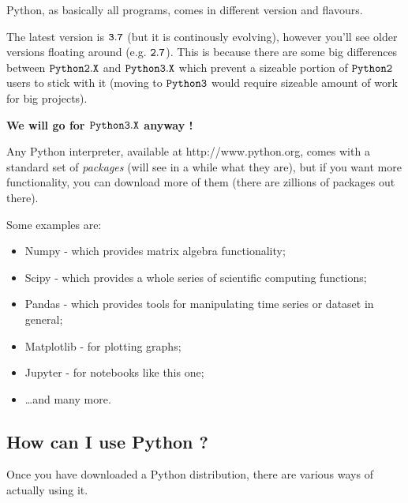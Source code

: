 \documentclass[11pt]{article}
\providecommand{\tightlist}{%
      \setlength{\itemsep}{0pt}\setlength{\parskip}{0pt}}
\begin{document}
Python, as basically all programs, comes in different version and
flavours.

The latest version is \(\tt{3.7}\) (but it is continously evolving),
however you'll see older versions floating around (e.g. \(\tt{2.7}\)).
This is because there are some big differences between
\(\tt{Python 2.X}\) and \(\tt{Python 3.X}\) which prevent a sizeable
portion of \(\tt{Python 2}\) users to stick with it (moving to
\(\tt{Python 3}\) would require sizeable amount of work for big
projects).

\textbf{We will go for \(\tt{Python 3.X}\) anyway !}

Any Python interpreter, available at http://www.python.org, comes with a
standard set of \emph{packages} (will see in a while what they are), but
if you want more functionality, you can download more of them (there are
zillions of packages out there).

Some examples are:

\begin{itemize}
\tightlist
\item
  Numpy - which provides matrix algebra functionality;
\item
  Scipy - which provides a whole series of scientific computing
  functions;
\item
  Pandas - which provides tools for manipulating time series or dataset
  in general;
\item
  Matplotlib - for plotting graphs;
\item
  Jupyter - for notebooks like this one;
\item
  \ldots{}and many more.
\end{itemize}

\hypertarget{how-can-i-use-python}{%
\subsection{How can I use Python ?}\label{how-can-i-use-python}}

Once you have downloaded a Python distribution, there are various ways
of actually using it.
\end{document}
